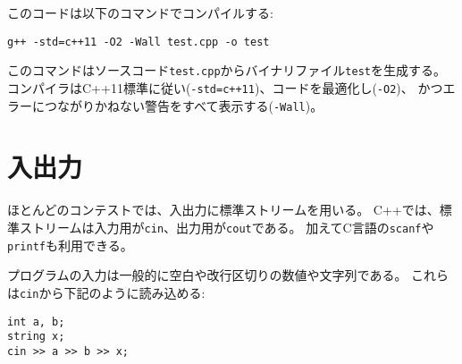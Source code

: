 このコードは以下のコマンドでコンパイルする:

\begin{lstlisting}
g++ -std=c++11 -O2 -Wall test.cpp -o test
\end{lstlisting}

\begin{comment}
This command produces a binary file \texttt{test}
from the source code \texttt{test.cpp}.
The compiler follows the C++11 standard
(\texttt{-std=c++11}),
optimizes the code (\texttt{-O2})
and shows warnings about possible errors (\texttt{-Wall}).
\end{comment}

このコマンドはソースコード\texttt{test.cpp}からバイナリファイル\texttt{test}を生成する。
コンパイラはC++11標準に従い(\texttt{-std=c++11})、コードを最適化し(\texttt{-O2})、
かつエラーにつながりかねない警告をすべて表示する(\texttt{-Wall})。

\begin{comment}
\section{Input and output}

\index{input and output}
\end{comment}

\section{入出力}

\begin{comment}
In most contests, standard streams are used for
reading input and writing output.
In C++, the standard streams are
\texttt{cin} for input and \texttt{cout} for output.
In addition, the C functions
\texttt{scanf} and \texttt{printf} can be used.

The input for the program usually consists of
numbers and strings that are separated with
spaces and newlines.
They can be read from the \texttt{cin} stream
as follows:
\end{comment}

ほとんどのコンテストでは、入出力に標準ストリームを用いる。
C++では、標準ストリームは入力用が\texttt{cin}、出力用が\texttt{cout}である。
加えてC言語の\texttt{scanf}や\texttt{printf}も利用できる。

プログラムの入力は一般的に空白や改行区切りの数値や文字列である。
これらは\texttt{cin}から下記のように読み込める:

\begin{lstlisting}
int a, b;
string x;
cin >> a >> b >> x;
\end{lstlisting}

